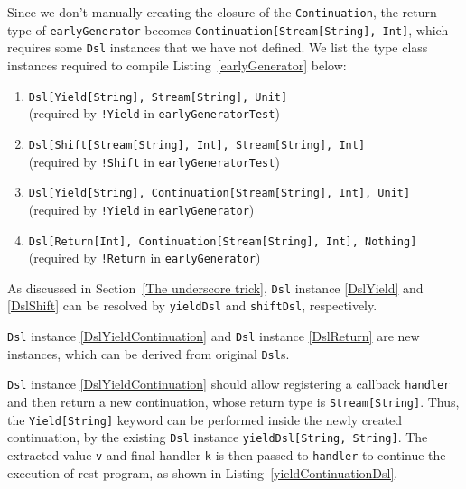 Since we don't manually creating the closure of the \lstinline{Continuation}, the return type of \lstinline{earlyGenerator} becomes \lstinline{Continuation[Stream[String], Int]}, which requires some \lstinline{Dsl} instances that we have not defined. We list the type class instances required to compile Listing~\ref{earlyGenerator} below:

\begin{enumerate}
  \item \lstinline{Dsl[Yield[String], Stream[String], Unit]} \\ (required by \lstinline{!Yield} in \lstinline{earlyGeneratorTest})
  \label{DslYield}

  \item \lstinline{Dsl[Shift[Stream[String], Int], Stream[String], Int]} \\ (required by \lstinline{!Shift} in \lstinline{earlyGeneratorTest})
  \label{DslShift}
  
  \item \lstinline{Dsl[Yield[String], Continuation[Stream[String], Int], Unit]} \\ (required by \lstinline{!Yield} in \lstinline{earlyGenerator})
  \label{DslYieldContinuation}
  
  \item \lstinline{Dsl[Return[Int], Continuation[Stream[String], Int], Nothing]} \\ (required by \lstinline{!Return} in \lstinline{earlyGenerator})
  \label{DslReturn}
\end{enumerate}

As discussed in Section~\ref{The underscore trick}, \lstinline{Dsl} instance \ref{DslYield} and \ref{DslShift} can be resolved by \lstinline{yieldDsl} and \lstinline{shiftDsl}, respectively.

\lstinline{Dsl} instance \ref{DslYieldContinuation} and \lstinline{Dsl} instance \ref{DslReturn} are new instances, which can be derived from original \lstinline{Dsl}s.

\lstinline{Dsl} instance \ref{DslYieldContinuation} should allow registering a callback \lstinline{handler} and then return a new continuation, whose return type is \lstinline{Stream[String]}. Thus, the \lstinline{Yield[String]} keyword can be performed inside the newly created continuation, by the existing \lstinline{Dsl} instance \lstinline{yieldDsl[String, String]}. The extracted value \lstinline{v} and final handler \lstinline{k} is then passed to \lstinline{handler} to continue the execution of rest program, as shown in Listing~\ref{yieldContinuationDsl}.

